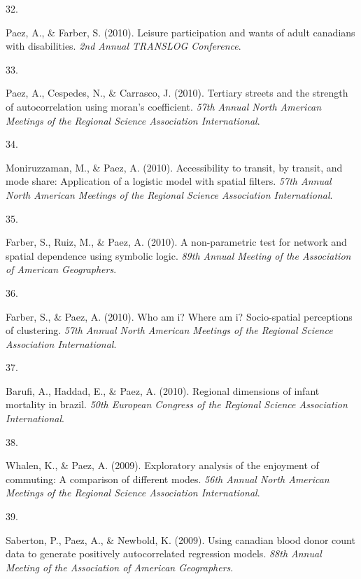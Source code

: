 \documentclass[10pt,a4paper,]{twentysecondcv}
\newlength{\csllabelwidth}
\newcommand{\CSLLeftMargin}[1]{\parbox[t]{\csllabelwidth}{#1}}
\newcommand{\CSLRightInline}[1]{\parbox[t]{\linewidth - \csllabelwidth}{#1}}
\begin{document}
\leavevmode{}%
\CSLLeftMargin{32. }%
\CSLRightInline{Paez, A., \& Farber, S. (2010). Leisure participation
and wants of adult canadians with disabilities. \emph{2nd Annual
TRANSLOG Conference}.}

\leavevmode{}%
\CSLLeftMargin{33. }%
\CSLRightInline{Paez, A., Cespedes, N., \& Carrasco, J. (2010). Tertiary
streets and the strength of autocorrelation using moran's coefficient.
\emph{57th Annual North American Meetings of the Regional Science
Association International}.}

\leavevmode{}%
\CSLLeftMargin{34. }%
\CSLRightInline{Moniruzzaman, M., \& Paez, A. (2010). Accessibility to
transit, by transit, and mode share: Application of a logistic model
with spatial filters. \emph{57th Annual North American Meetings of the
Regional Science Association International}.}

\leavevmode{}%
\CSLLeftMargin{35. }%
\CSLRightInline{Farber, S., Ruiz, M., \& Paez, A. (2010). A
non-parametric test for network and spatial dependence using symbolic
logic. \emph{89th Annual Meeting of the Association of American
Geographers}.}

\leavevmode{}%
\CSLLeftMargin{36. }%
\CSLRightInline{Farber, S., \& Paez, A. (2010). Who am i? Where am i?
Socio-spatial perceptions of clustering. \emph{57th Annual North
American Meetings of the Regional Science Association International}.}

\leavevmode{}%
\CSLLeftMargin{37. }%
\CSLRightInline{Barufi, A., Haddad, E., \& Paez, A. (2010). Regional
dimensions of infant mortality in brazil. \emph{50th European Congress
of the Regional Science Association International}.}

\leavevmode{}%
\CSLLeftMargin{38. }%
\CSLRightInline{Whalen, K., \& Paez, A. (2009). Exploratory analysis of
the enjoyment of commuting: A comparison of different modes. \emph{56th
Annual North American Meetings of the Regional Science Association
International}.}

\leavevmode{}%
\CSLLeftMargin{39. }%
\CSLRightInline{Saberton, P., Paez, A., \& Newbold, K. (2009). Using
canadian blood donor count data to generate positively autocorrelated
regression models. \emph{88th Annual Meeting of the Association of
American Geographers}.}
\end{document}
